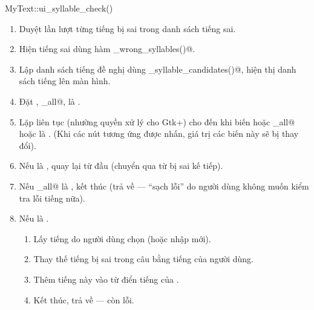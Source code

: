 \documentclass[a4paper,oneside,14pt]{extbook} %
\begin{document}
\begin{algo}
\caption{MyText::ui\_syllable\_check()}
\label{algo:MyText::ui_syllable_check}
\begin{enumerate}
\item Duyệt lần lượt từng tiếng bị sai trong danh sách tiếng sai.
\item Hiện tiếng sai dùng hàm \verb@show_wrong_syllables()@.
\item Lập danh sách tiếng đề nghị dùng
  \verb@get_syllable_candidates()@, hiện thị danh sách tiếng lên màn
  hình.
\item Đặt \verb@processed@, \verb@ignore_all@, \verb@ignore@ là
  \verb@false@. 
\item Lặp liên tục (nhường quyền xử lý cho Gtk+) cho đến khi biến
  \verb@ignore@ hoặc \verb@ignore_all@ hoặc \verb@processed@ là
  \verb@true@. (Khi các nút tương ứng được nhấn, giá trị các biến này
  sẽ bị thay đổi).
\item Nếu \verb@ignore@ là \verb@true@, quay lại từ đầu (chuyển qua từ bị sai
  kế tiếp).
\item Nếu \verb@ignore_all@ là \verb@true@, kết thúc (trả về
  \verb@true@ --- ``sạch lỗi'' do người dùng không muốn kiểm tra lỗi
  tiếng nữa).
\item Nếu \verb@processed@ là \verb@true@.
  \begin{enumerate}
  \item Lấy tiếng do người dùng chọn (hoặc nhập mới).
  \item Thay thế tiếng bị sai trong câu bằng tiếng của người dùng.
  \item Thêm tiếng này vào từ điển tiếng của \verb@VSpell@.
  \item Kết thúc, trả về \verb@false@ --- còn lỗi.
  \end{enumerate}
\end{enumerate}
\end{algo}
\end{document}
